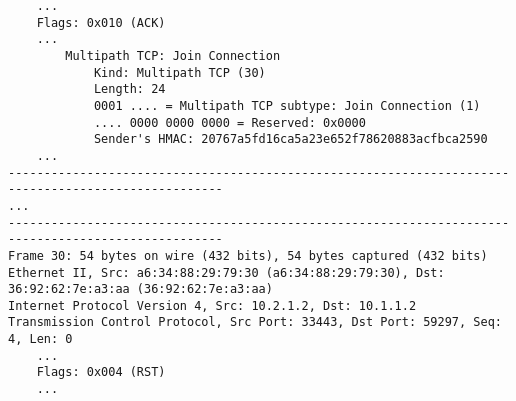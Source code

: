 \begin{verbatim}
    ...
    Flags: 0x010 (ACK)
    ...
        Multipath TCP: Join Connection
            Kind: Multipath TCP (30)
            Length: 24
            0001 .... = Multipath TCP subtype: Join Connection (1)
            .... 0000 0000 0000 = Reserved: 0x0000
            Sender's HMAC: 20767a5fd16ca5a23e652f78620883acfbca2590
    ...
----------------------------------------------------------------------------------------------------
...
----------------------------------------------------------------------------------------------------
Frame 30: 54 bytes on wire (432 bits), 54 bytes captured (432 bits)
Ethernet II, Src: a6:34:88:29:79:30 (a6:34:88:29:79:30), Dst: 36:92:62:7e:a3:aa (36:92:62:7e:a3:aa)
Internet Protocol Version 4, Src: 10.2.1.2, Dst: 10.1.1.2
Transmission Control Protocol, Src Port: 33443, Dst Port: 59297, Seq: 4, Len: 0
    ...
    Flags: 0x004 (RST)
    ...
	\end{verbatim}
\endgroup